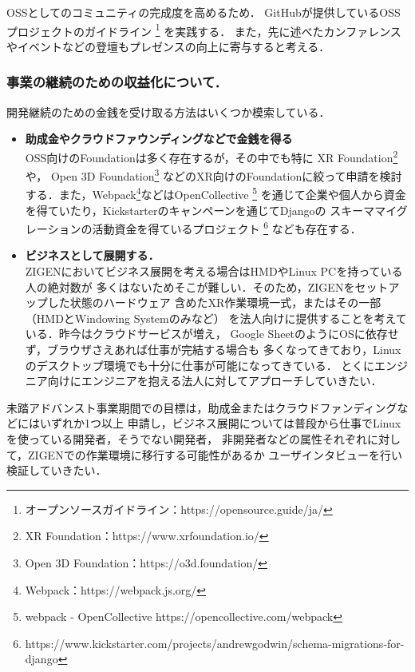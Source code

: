 OSSとしてのコミュニティの完成度を高めるため．
GitHubが提供しているOSSプロジェクトのガイドライン
\footnote{オープンソースガイドライン：https://opensource.guide/ja/}
を実践する．
また，先に述べたカンファレンスやイベントなどの登壇もプレゼンスの向上に寄与すると考える．

\subsubsection*{事業の継続のための収益化について．}

開発継続のための金銭を受け取る方法はいくつか模索している．

\begin{itemize}
  \item \textbf{助成金やクラウドファウンディングなどで金銭を得る\\}
        OSS向けのFoundationは多く存在するが，その中でも特に
        XR Foundation\footnote{XR Foundation：https://www.xrfoundation.io/}や，
        Open 3D Foundation\footnote{Open 3D Foundation：https://o3d.foundation/}
        などのXR向けのFoundationに絞って申請を検討する．また，Webpack\footnote{Webpack：https://webpack.js.org/}などはOpenCollective
        \footnote{webpack - OpenCollective https://opencollective.com/webpack}
        を通じて企業や個人から資金を得ていたり，Kickstarterのキャンペーンを通じてDjangoの
        スキーママイグレーションの活動資金を得ているプロジェクト
        \footnote{https://www.kickstarter.com/projects/andrewgodwin/schema-migrations-for-django}
        なども存在する．
  \item \textbf{ビジネスとして展開する．\\}
        ZIGENにおいてビジネス展開を考える場合はHMDやLinux PCを持っている人の絶対数が
        多くはないためそこが難しい．そのため，ZIGENをセットアップした状態のハードウェア
        含めたXR作業環境一式，またはその一部（HMDとWindowing Systemのみなど）
        を法人向けに提供することを考えている．昨今はクラウドサービスが増え，
        Google SheetのようにOSに依存せず，ブラウザさえあれば仕事が完結する場合も
        多くなってきており，Linuxのデスクトップ環境でも十分に仕事が可能になってきている．
        とくにエンジニア向けにエンジニアを抱える法人に対してアプローチしていきたい．
\end{itemize}

未踏アドバンスト事業期間での目標は，助成金またはクラウドファンディングなどにはいずれか1つ以上
申請し，ビジネス展開については普段から仕事でLinuxを使っている開発者，そうでない開発者，
非開発者などの属性それぞれに対して，ZIGENでの作業環境に移行する可能性があるか
ユーザインタビューを行い検証していきたい．

